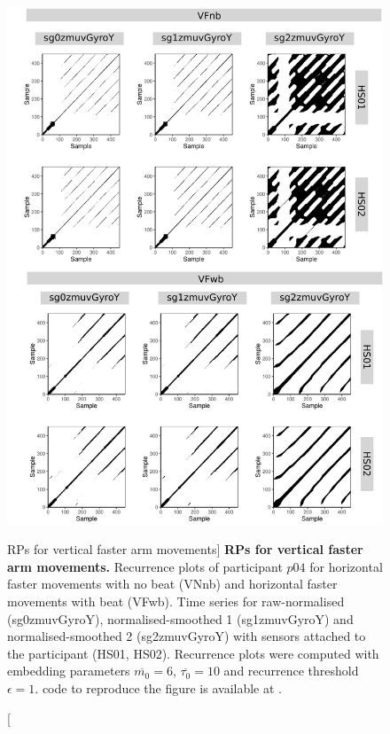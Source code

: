 \begin{figure}
\centering
\includegraphics[height=0.8\textheight]{rps_VF_w500_p04}
\caption
	[RPs for vertical faster arm movements]{
	{\bf RPs for vertical faster arm movements.}	
	Recurrence plots of participant $p04$ for 
	horizontal faster movements with no beat (VNnb) and
	horizontal faster movements with beat (VFwb).
	Time series for raw-normalised (sg0zmuvGyroY), 
	normalised-smoothed 1 (sg1zmuvGyroY) and 
	normalised-smoothed 2 (sg2zmuvGyroY) with
	sensors attached to the participant (HS01, HS02).
	Recurrence plots were computed with 
	embedding parameters $\overline{m_0}=6$, $\overline{\tau_0}=10$ and
	recurrence threshold $\epsilon=1$.
		\R code to reproduce the figure is available at 
		.
        }
    \label{fig:rps_VF_w500_p04}
\end{figure}







